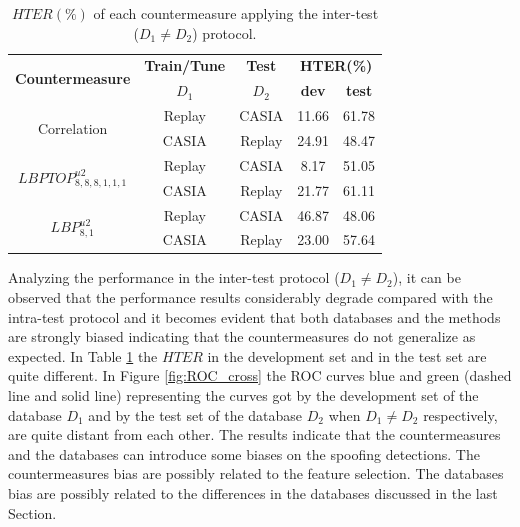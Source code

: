 \hspace{-17mm}\begin{table}[ht!]
\caption{$HTER(\%)$ of each countermeasure applying the inter-test ($D_1 \neq D_2$) protocol.}
\begin{center}
  \begin{tabular}{ | c | c | c | c  c | }
    \hline

   \multirow{2}{*}{\textbf{Countermeasure}} & \textbf{Train/Tune} & \textbf{Test} & \multicolumn{2}{c|}{\textbf{HTER(\%)}} \\ 
     & $D_1$ & $D_2$ & \textbf{dev} & \textbf{test}  \\ \hline
    
    \multirow{2}{*}{Correlation} &  Replay & CASIA & 11.66 & 61.78  \\ 
               & CASIA  & Replay & 24.91 & 48.47  \\ \hline \hline

    \multirow{2}{*}{$LBPTOP_{8,8,8,1,1,1}^{u2}$}  &  Replay  & CASIA  & 8.17 & 51.05   \\
               & CASIA  & Replay & 21.77 & 61.11   \\ \hline \hline

    \multirow{2}{*}{$LBP_{8,1}^{u2}$} &  Replay  & CASIA  & 46.87  & 48.06   \\
               & CASIA  & Replay & 23.00 & 57.64  \\
            
    \hline
  \end{tabular}
\end{center}
\label{tb:InterTest}
\end{table}

Analyzing the performance in the inter-test protocol ($D_1 \neq D_2$), it can be observed that the performance results considerably degrade compared with the intra-test protocol and it becomes evident that both databases and the methods are strongly biased indicating that the countermeasures do not generalize as expected. In Table \ref{tb:InterTest} the $HTER$ in the development set and in the test set are quite different. In Figure \ref{fig:ROC_cross} the ROC curves blue and green (dashed line and solid line) representing the curves got by the development set of the database $D_1$ and by the test set of the database $D_2$ when $D_1 \neq D_2$ respectively, are quite distant from each other. The results indicate that the countermeasures and the databases can introduce some biases on the spoofing detections. The countermeasures bias are possibly related to the feature selection. The databases bias are possibly related to the differences in the databases discussed in the last Section.

